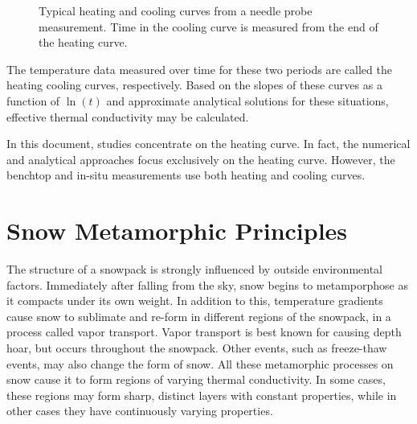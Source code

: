 \begin{figure}[h]
\centering
{}
\caption{Typical heating and cooling curves from a needle probe measurement.
Time in the cooling curve is measured from the end of the heating curve.}
\end{figure}

The temperature data measured over time for these two periods are called the
heating cooling curves, respectively.  Based on the slopes of these
curves as a function of \(\ln(t)\) and approximate analytical solutions for
these situations, effective thermal conductivity may be calculated.

In this document, studies concentrate on the heating curve. In fact, the
numerical and analytical approaches focus exclusively on the heating curve. However, the
benchtop and in-situ measurements use both heating and cooling curves.

\section{Snow Metamorphic Principles}
\label{sec:introduction:metamorphic}

The structure of a snowpack is strongly influenced by outside environmental
factors. Immediately after falling from the sky, snow begins to metamporphose as
it compacts under its own weight. In addition to this, temperature gradients
cause snow to sublimate and re-form in different regions of the snowpack, in a
process called vapor transport. Vapor transport is best known for causing
depth hoar, but occurs throughout the snowpack. Other events, such as
freeze-thaw events, may also change the form of snow. All these metamorphic
processes on snow cause it to form regions of varying thermal conductivity. In
some cases, these regions may form sharp, distinct layers with constant
properties, while in other cases they have continuously varying properties.

